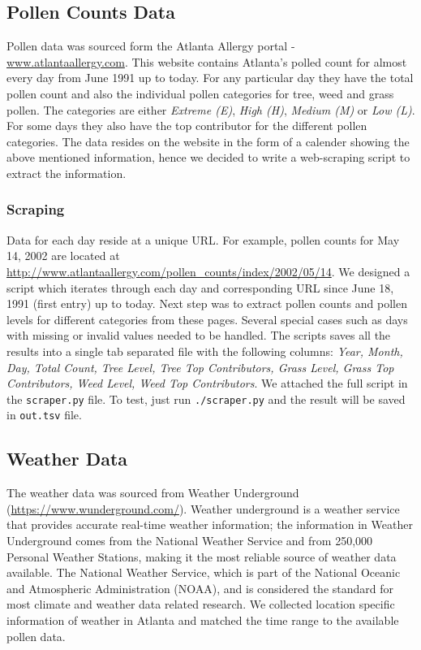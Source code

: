 \documentclass[a4paper,11pt]{article}
\begin{document}
\subsection{Pollen Counts Data}
Pollen data was sourced form the Atlanta Allergy portal - \url{www.atlantaallergy.com}. This website contains Atlanta's polled count for almost every day from June 1991 up to today. For any particular day they have the total pollen count and also the individual pollen categories for tree, weed and grass pollen. The categories are either \textit{Extreme (E)}, \textit{High (H)}, \textit{Medium (M)} or \textit{Low (L)}. For some days they also have the top contributor for the different pollen categories. The data resides on the website in the form of a calender showing the above mentioned information, hence we decided to write a web-scraping script to extract the information.
\subsubsection{Scraping}
Data for each day reside at a unique URL. For example, pollen counts for May 14, 2002 are located at \url{http://www.atlantaallergy.com/pollen_counts/index/2002/05/14}. We designed a script which iterates through each day and corresponding URL since June 18, 1991 (first entry) up to today. Next step was to extract pollen counts and pollen levels for different categories from these pages. Several special cases such as days with missing or invalid values needed to be handled. The scripts saves all the results into a single tab separated file with the following columns: \emph{Year, Month, Day, Total Count, Tree Level, Tree Top Contributors, Grass Level, Grass Top Contributors, Weed Level, Weed Top Contributors}. We attached the full script in the \texttt{scraper.py} file. To test, just run \texttt{./scraper.py} and the result will be saved in \texttt{out.tsv} file.

\subsection{Weather Data}

The weather data was sourced from Weather Underground (\url{https://www.wunderground.com/}). Weather underground is a weather service that provides accurate real-time weather information; the information in Weather Underground comes from the National Weather Service and from 250,000 Personal Weather Stations, making it the most reliable source of weather data available. The National Weather Service, which is part of the National Oceanic and Atmospheric Administration (NOAA), and is considered the standard for most climate and weather data related research. We collected location specific information of weather in Atlanta and matched the time range to the available pollen data. 
\end{document}
